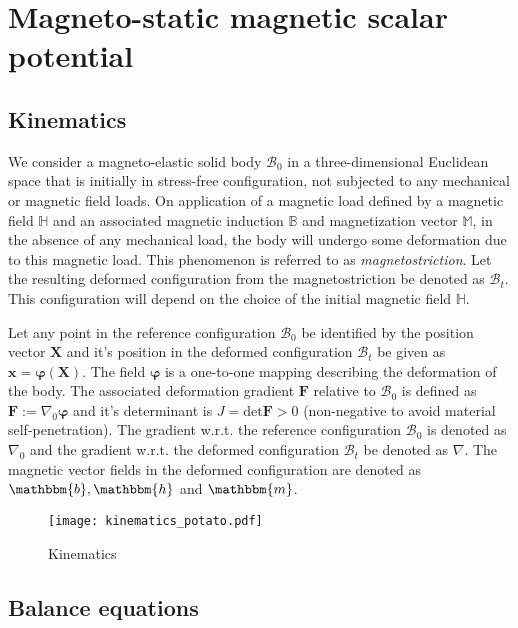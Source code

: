 \chapter{Magneto-static magnetic scalar potential}

\section{Kinematics}
We consider a magneto-elastic solid body $\mathcal{B}_0$ in a three-dimensional Euclidean space that is initially in stress-free configuration, not subjected to any mechanical or magnetic field loads. On application of a magnetic load defined by a magnetic field $\mathbb{H}$ and an associated magnetic induction $\mathbb{B}$ and magnetization vector $\mathbb{M}$, in the absence of any mechanical load, the body will undergo some deformation due to this magnetic load. This phenomenon is referred to as \textit{magnetostriction}. Let the resulting deformed configuration from the magnetostriction be denoted as $\mathcal{B}_t$. This configuration will depend on the choice of the initial magnetic field $\mathbb{H}$. \par 
Let any point in the reference configuration $\mathcal{B}_0$ be identified by the position vector $\mathbf{X}$ and it's position in the deformed configuration $\mathcal{B}_t$ be given as $\mathbf{x} = \bm{\varphi} (\mathbf{X})$. The field $\bm{\varphi}$ is a one-to-one mapping describing the deformation of the body. The associated deformation gradient $\mathbf{F}$ relative to $\mathcal{B}_0$ is defined as $\mathbf{F} := \nabla_0 \bm{\varphi}$ and it's determinant is $J = \text{det}\mathbf{F} > 0$ (non-negative to avoid material self-penetration). The gradient w.r.t. the reference configuration $\mathcal{B}_0$ is denoted as $\nabla_0$ and the gradient w.r.t. the deformed configuration $\mathcal{B}_t$ be denoted as $\nabla$. The magnetic vector fields in the deformed configuration are denoted as $\mathbbm{b}, \mathbbm{h}$ and $\mathbbm{m}$.\par 

\begin{figure}[h]
\centering 
\texttt{[image: kinematics\_potato.pdf]}
\caption{Kinematics}
\label{fig:1.1}
\end{figure} 

\section{Balance equations}
